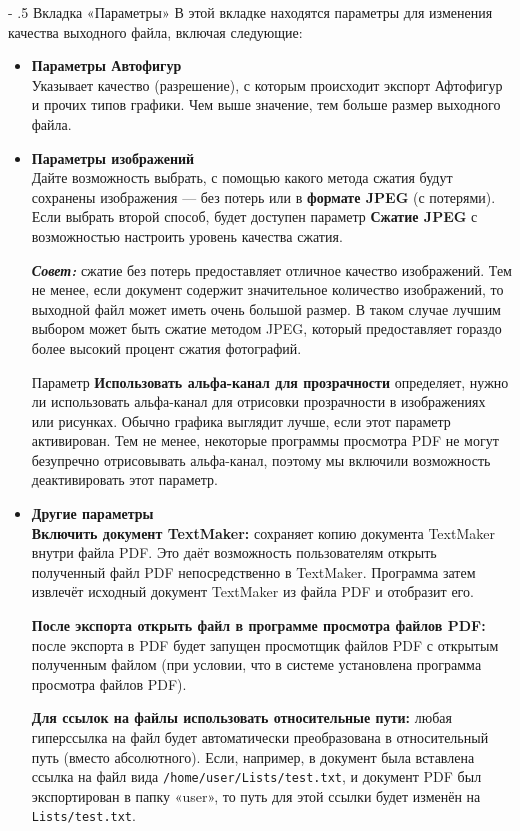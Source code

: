 ﻿\documentclass[a4paper,10pt]{article}
\makeatletter
\renewcommand\paragraph{%
   \@startsection{paragraph}{4}{0mm}%
      {-\baselineskip}%
      {.5\baselineskip}%
      {\normalfont\normalsize\bfseries}}
\makeatother
\begin{document}
\paragraph{Вкладка «Параметры»}
В этой вкладке находятся параметры для изменения качества выходного файла, включая следующие:
\begin{itemize}
 \item \textbf{Параметры Автофигур}\\
 Указывает качество (разрешение), с которым происходит экспорт Афтофигур и прочих типов графики. Чем выше значение, тем больше размер выходного файла.
 \item \textbf{Параметры изображений}\\
 Дайте возможность выбрать, с помощью какого метода сжатия будут сохранены изображения — без потерь или в \textbf{формате JPEG} (с потерями). Если выбрать второй способ, будет доступен параметр \textbf{Сжатие JPEG} с возможностью настроить уровень качества сжатия.
 
 \begin{mdframed}[backgroundcolor=blue!10]
\textbf{\textit{Совет:}} сжатие без потерь предоставляет отличное качество изображений. Тем не менее, если документ содержит значительное количество изображений, то выходной файл может иметь очень большой размер. В таком случае лучшим выбором может быть сжатие методом JPEG, который предоставляет гораздо более высокий процент сжатия фотографий.
\end{mdframed}
Параметр \textbf{Использовать альфа-канал для прозрачности} определяет, нужно ли использовать альфа-канал для отрисовки прозрачности в изображениях или рисунках. Обычно графика выглядит лучше, если этот параметр активирован. Тем не менее, некоторые программы просмотра PDF не могут безупречно отрисовывать альфа-канал, поэтому мы включили возможность деактивировать этот параметр.
\item \textbf{Другие параметры}\\
\textbf{Включить документ TextMaker:} сохраняет копию документа TextMaker внутри файла PDF. Это даёт возможность пользователям открыть полученный файл PDF непосредственно в TextMaker. Программа затем извлечёт исходный документ TextMaker из файла PDF и отобразит его.

\textbf{После экспорта открыть файл в программе просмотра файлов PDF:} после экспорта в PDF будет запущен просмотщик файлов PDF с открытым полученным файлом (при условии, что в системе установлена программа просмотра файлов PDF).

\textbf{Для ссылок на файлы использовать относительные пути:} любая гиперссылка на файл будет автоматически преобразована в относительный путь (вместо абсолютного). Если, например, в документ была вставлена ссылка на файл вида \texttt{/home/user/Lists/test.txt}, и документ PDF был экспортирован в папку «user», то путь для этой ссылки будет изменён на \texttt{Lists/test.txt}.


\end{itemize}
\end{document}
